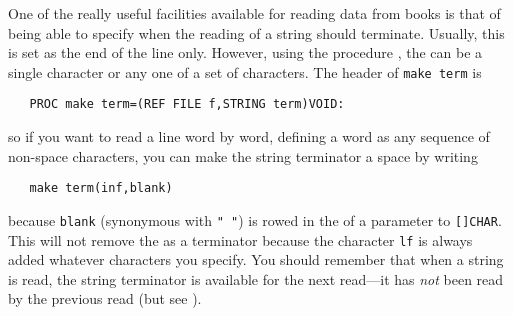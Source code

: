 One of the really useful facilities available for reading data from
books is that of being able to specify when the reading of a string
should terminate. Usually, this is set as the end of the line only.
However, using the procedure , the
 can be a single character or any one of a set
of characters. The header of \verb|make term| is
\begin{verbatim}
   PROC make term=(REF FILE f,STRING term)VOID:
\end{verbatim}
\noindent
so if you want to read a line word by word, defining a word as any
sequence of non-space characters, you can make the string terminator a
space by writing
\begin{verbatim}
   make term(inf,blank)
\end{verbatim}
\noindent
because \verb|blank| (synonymous with \verb*|" "|) is rowed in the
 of a parameter to \verb|[]CHAR|.
This will not remove the  as a terminator because the
character \verb|lf| is always added whatever characters you specify.
You should remember that when a string is read, the string terminator
is available for the next read---it has \emph{not} been read by the
previous read (but see ).

